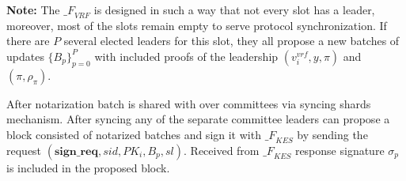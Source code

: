 \begin{enumerate}
    \textbf{Note:} The ${\mathcal_{F}}_{VRF}$ is designed in such a way that not every slot has a leader, moreover, most of the slots remain empty to serve protocol synchronization.
    If there are $P$ several elected leaders for this slot, they all propose a new batches of updates $\{B_p\}_{p=0}^P$ with included proofs of the leadership ${(v_i^{vrf}, y, \pi)}$ and
    ${(\pi, \rho_\pi)}$.

    After notarization batch is shared with over committees via syncing shards mechanism.
    After syncing any of the separate committee leaders can propose a block consisted of notarized batches and sign it with ${\mathcal_{F}}_{KES}$ by sending the request ${(\textbf{sign\_req}, sid, PK_i, B_p, sl)}$.
    Received from ${\mathcal_{F}}_{KES}$ response signature $\sigma_p$ is included in the proposed block.

\end{enumerate}